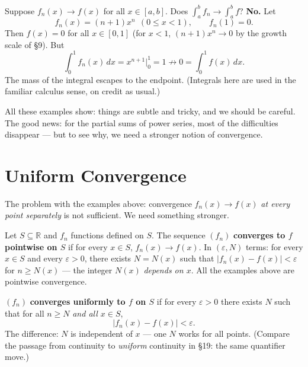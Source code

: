 \documentclass[11pt]{report}
\begin{document}
\begin{exbox}
Suppose $f_n(x) \to f(x)$ for all $x \in [a,b]$. Does $\int_a^b f_n \to \int_a^b f$? \textbf{No.} Let
\[
f_n(x) = (n+1)x^n \ \ (0 \leq x < 1), \qquad f_n(1) = 0.
\]
Then $f(x) = 0$ for all $x \in [0,1]$ (for $x < 1$, $(n+1)x^n \to 0$ by the growth scale of \S 9). But
\[
\int_0^1 f_n(x)\,dx = x^{n+1}\Big|_0^1 = 1 \not\longrightarrow 0 = \int_0^1 f(x)\,dx.
\]
The mass of the integral escapes to the endpoint. (Integrals here are used in the familiar calculus sense, on credit as usual.)
\end{exbox}

All these examples show: things are subtle and tricky, and we should be careful. The good news: for the partial sums of power series, most of the difficulties disappear --- but to see why, we need a stronger notion of convergence.


\section{Uniform Convergence}

The problem with the examples above: convergence $f_n(x) \to f(x)$ \emph{at every point separately} is not sufficient. We need something stronger.

\begin{defbox}
Let $S \subseteq \mathbb{R}$ and $f_n$ functions defined on $S$. The sequence $(f_n)$ \textbf{converges to $f$ pointwise on $S$} if for every $x \in S$, $f_n(x) \to f(x)$. In $(\varepsilon, N)$ terms: for every $x \in S$ and every $\varepsilon > 0$, there exists $N = N(x)$ such that $|f_n(x) - f(x)| < \varepsilon$ for $n \geq N(x)$ --- the integer $N(x)$ \emph{depends on $x$}. All the examples above are pointwise convergence.
\end{defbox}

\begin{defbox}
$(f_n)$ \textbf{converges uniformly to $f$ on $S$} if for every $\varepsilon > 0$ there exists $N$ such that for all $n \geq N$ \emph{and all $x \in S$},
\[
|f_n(x) - f(x)| < \varepsilon.
\]
The difference: $N$ is independent of $x$ --- one $N$ works for all points. (Compare the passage from continuity to \emph{uniform} continuity in \S 19: the same quantifier move.)
\end{defbox}
\end{document}
